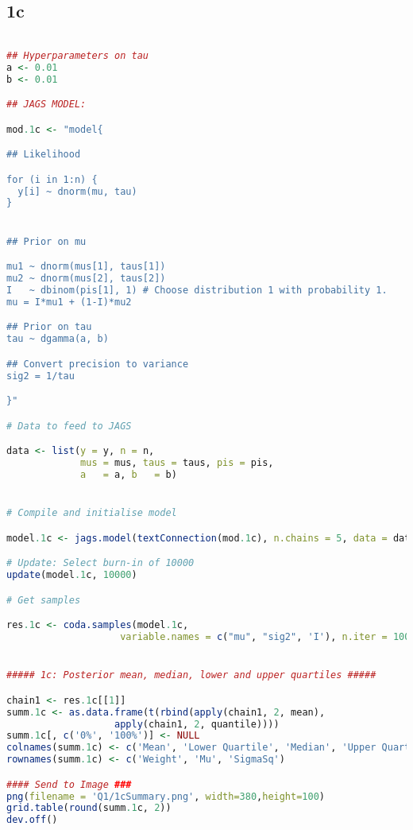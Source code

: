 \documentclass{article}
\begin{document}
\subsection{1c} \label{appA1c}
\begin{lstlisting}[language=R]

## Hyperparameters on tau
a <- 0.01
b <- 0.01

## JAGS MODEL:

mod.1c <- "model{

## Likelihood

for (i in 1:n) {
  y[i] ~ dnorm(mu, tau)
}


## Prior on mu

mu1 ~ dnorm(mus[1], taus[1])
mu2 ~ dnorm(mus[2], taus[2])
I   ~ dbinom(pis[1], 1) # Choose distribution 1 with probability 1. 
mu = I*mu1 + (1-I)*mu2

## Prior on tau
tau ~ dgamma(a, b)

## Convert precision to variance
sig2 = 1/tau

}"

# Data to feed to JAGS

data <- list(y = y, n = n, 
             mus = mus, taus = taus, pis = pis,
             a   = a, b   = b)


# Compile and initialise model

model.1c <- jags.model(textConnection(mod.1c), n.chains = 5, data = data)

# Update: Select burn-in of 10000
update(model.1c, 10000)

# Get samples

res.1c <- coda.samples(model.1c, 
                    variable.names = c("mu", "sig2", 'I'), n.iter = 10000)


##### 1c: Posterior mean, median, lower and upper quartiles #####

chain1 <- res.1c[[1]]
summ.1c <- as.data.frame(t(rbind(apply(chain1, 2, mean), 
                   apply(chain1, 2, quantile))))
summ.1c[, c('0%', '100%')] <- NULL
colnames(summ.1c) <- c('Mean', 'Lower Quartile', 'Median', 'Upper Quartile')
rownames(summ.1c) <- c('Weight', 'Mu', 'SigmaSq')

#### Send to Image ###
png(filename = 'Q1/1cSummary.png', width=380,height=100) 
grid.table(round(summ.1c, 2)) 
dev.off()
\end{lstlisting}
\newpage
\end{document}
